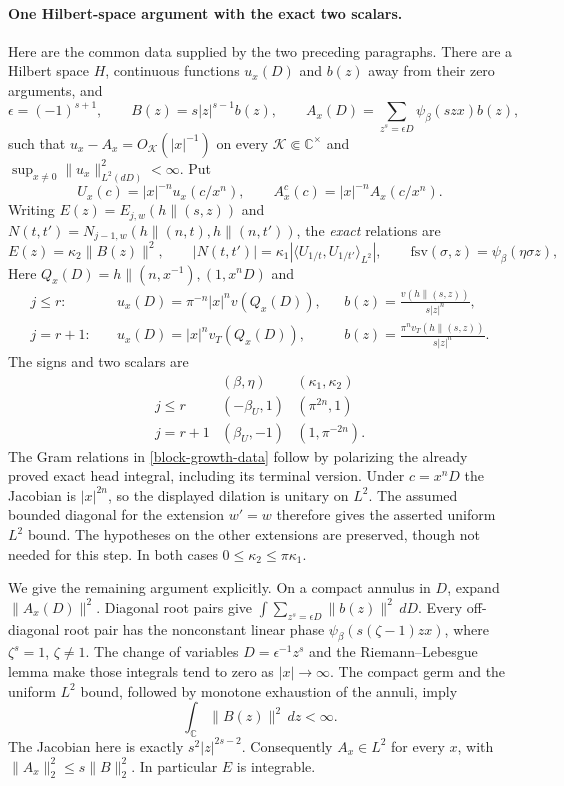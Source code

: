 \paragraph{One Hilbert-space argument with the exact two scalars.}
Here are the common data supplied by the two preceding paragraphs.
There are a Hilbert space $H$, continuous functions
$u_x(D)$ and $b(z)$ away from their zero arguments, and
\[
 \epsilon=(-1)^{s+1},\qquad
 B(z)=s|z|^{s-1}b(z),\qquad
 A_x(D)=\sum_{z^s=\epsilon D}\psi_\beta(szx)b(z),
\]
such that $u_x-A_x=O_{\mathcal K}(|x|^{-1})$ on every
$\mathcal K\Subset\mathbb C^\times$ and
$\sup_{x\ne0}\|u_x\|_{L^2(dD)}^2<\infty$.
Put
\[
 U_x(c)=|x|^{-n}u_x(c/x^n),\qquad
 A^c_x(c)=|x|^{-n}A_x(c/x^n).
\]
Writing $E(z)=E_{j,w}(h\mathbin{\|}(s,z))$ and
$N(t,t')=N_{j-1,w}(h\mathbin{\|}(n,t),h\mathbin{\|}(n,t'))$,
the \emph{exact} relations are
\begin{equation}\label{block-growth-data}
 E(z)=\kappa_2\|B(z)\|^2,\qquad
 |N(t,t')|=\kappa_1|\langle U_{1/t},U_{1/t'}\rangle_{L^2}|,
 \qquad \mathrm{fsv}(\sigma,z)=\psi_\beta(\eta\sigma z),
\end{equation}
Here $Q_x(D)=h\mathbin{\|}(n,x^{-1}),(1,x^nD)$ and
\[
 \begin{aligned}
 j\le r:&\quad u_x(D)=\pi^{-n}|x|^nv(Q_x(D)),
       &&b(z)=\frac{v(h\mathbin{\|}(s,z))}{s|z|^n},\\
 j=r+1:&\quad u_x(D)=|x|^nv_T(Q_x(D)),
       &&b(z)=\frac{\pi^nv_T(h\mathbin{\|}(s,z))}{s|z|^n}.
 \end{aligned}
\]
The signs and two scalars are
\[
\begin{array}{c|c|c}
 & (\beta,\eta)&(\kappa_1,\kappa_2)\\ \hline
 j\le r&(-\beta_U,1)&(\pi^{2n},1)\\
 j=r+1&(\beta_U,-1)&(1,\pi^{-2n}).
\end{array}
\]
The Gram relations in \eqref{block-growth-data} follow by
polarizing the already proved exact head integral, including
its terminal version.  Under $c=x^nD$ the Jacobian is
$|x|^{2n}$, so the displayed dilation is unitary on $L^2$.
The assumed bounded diagonal for the extension $w'=w$ therefore
gives the asserted uniform $L^2$ bound.  The hypotheses on the
other extensions are preserved, though not needed for this step.
In both cases $0\le\kappa_2\le\pi\kappa_1$.

We give the remaining argument explicitly.  On a compact annulus
in $D$, expand $\|A_x(D)\|^2$.  Diagonal root pairs give
$\int\sum_{z^s=\epsilon D}\|b(z)\|^2\,dD$.
Every off-diagonal root pair has the nonconstant linear phase
$\psi_\beta(s(\zeta-1)zx)$, where $\zeta^s=1$, $\zeta\ne1$.
The change of variables $D=\epsilon^{-1}z^s$ and the
Riemann--Lebesgue lemma make those integrals tend to zero as
$|x|\to\infty$.  The compact germ and the uniform $L^2$ bound,
followed by monotone exhaustion of the annuli, imply
\[
 \int_{\mathbb C}\|B(z)\|^2\,dz<\infty.
\]
The Jacobian here is exactly $s^2|z|^{2s-2}$.
Consequently $A_x\in L^2$ for every $x$, with
$\|A_x\|_2^2\le s\|B\|_2^2$.  In particular $E$ is integrable.


